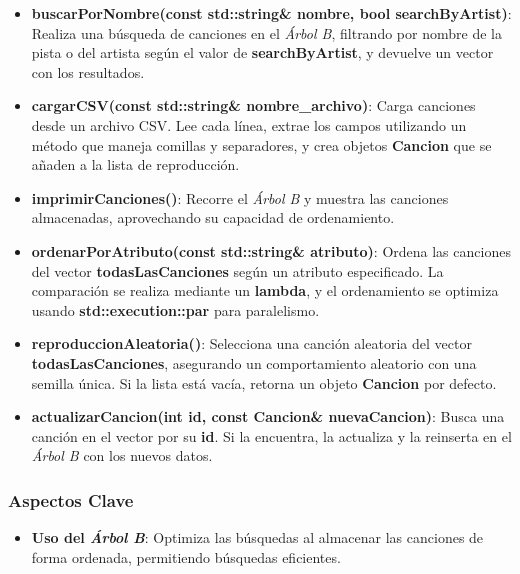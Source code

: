 \documentclass[12pt]{article}
\begin{document}
\begin{flushleft}
\begin{itemize}[left=4em]
                    \item \textbf{buscarPorNombre(const std::string\& nombre, bool searchByArtist)}: Realiza una búsqueda de canciones en el \textit{Árbol B}, filtrando por nombre de la pista o del artista según el valor de \textbf{searchByArtist}, y devuelve un vector con los resultados.
                
                    \item \textbf{cargarCSV(const std::string\& nombre\_archivo)}: Carga canciones desde un archivo CSV. Lee cada línea, extrae los campos utilizando un método que maneja comillas y separadores, y crea objetos \textbf{Cancion} que se añaden a la lista de reproducción.
                
                    \item \textbf{imprimirCanciones()}: Recorre el \textit{Árbol B} y muestra las canciones almacenadas, aprovechando su capacidad de ordenamiento.
                
                    \item \textbf{ordenarPorAtributo(const std::string\& atributo)}: Ordena las canciones del vector \textbf{todasLasCanciones} según un atributo especificado. La comparación se realiza mediante un \textbf{lambda}, y el ordenamiento se optimiza usando \textbf{std::execution::par} para paralelismo.
                
                    \item \textbf{reproduccionAleatoria()}: Selecciona una canción aleatoria del vector \textbf{todasLasCanciones}, asegurando un comportamiento aleatorio con una semilla única. Si la lista está vacía, retorna un objeto \textbf{Cancion} por defecto.
                
                    \item \textbf{actualizarCancion(int id, const Cancion\& nuevaCancion)}: Busca una canción en el vector por su \textbf{id}. Si la encuentra, la actualiza y la reinserta en el \textit{Árbol B} con los nuevos datos.
                \end{itemize}
            
            \subsubsection{Aspectos Clave}
            
                \begin{itemize}[left=4em]
                
                    \item \textbf{Uso del \textit{Árbol B}}: Optimiza las búsquedas al almacenar las canciones de forma ordenada, permitiendo búsquedas eficientes.
                    

\end{itemize}
\end{flushleft}
\end{document}
